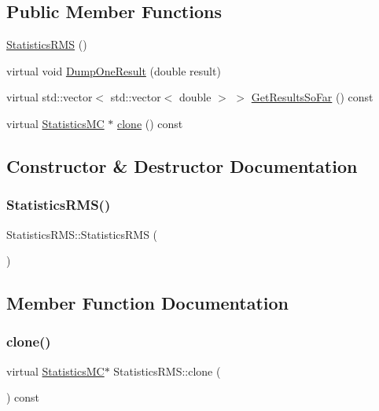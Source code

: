 \subsection*{Public Member Functions}
\begin{DoxyCompactItemize}
\item 
\hyperlink{classStatisticsRMS_affda90d3db0f1acde8094e1315abcd3f}{Statistics\+R\+MS} ()
\item 
virtual void \hyperlink{classStatisticsRMS_af9c972ac6ee7938f6690a99ee51b5771}{Dump\+One\+Result} (double result)
\item 
virtual std\+::vector$<$ std\+::vector$<$ double $>$ $>$ \hyperlink{classStatisticsRMS_a7c6b6ca7df8fac1cbfb16bca6272445b}{Get\+Results\+So\+Far} () const
\item 
virtual \hyperlink{classStatisticsMC}{Statistics\+MC} $\ast$ \hyperlink{classStatisticsRMS_af14e9befb5bfdb68b70e2e3e68206081}{clone} () const
\end{DoxyCompactItemize}


\subsection{Constructor \& Destructor Documentation}
\hypertarget{classStatisticsRMS_affda90d3db0f1acde8094e1315abcd3f}{}\label{classStatisticsRMS_affda90d3db0f1acde8094e1315abcd3f} 
\subsubsection{\texorpdfstring{Statistics\+R\+M\+S()}{StatisticsRMS()}}
{\footnotesize\ttfamily Statistics\+R\+M\+S\+::\+Statistics\+R\+MS (\begin{DoxyParamCaption}{ }\end{DoxyParamCaption})}



\subsection{Member Function Documentation}
\hypertarget{classStatisticsRMS_af14e9befb5bfdb68b70e2e3e68206081}{}\label{classStatisticsRMS_af14e9befb5bfdb68b70e2e3e68206081} 
\subsubsection{\texorpdfstring{clone()}{clone()}}
{\footnotesize\ttfamily virtual \hyperlink{classStatisticsMC}{Statistics\+MC}$\ast$ Statistics\+R\+M\+S\+::clone (\begin{DoxyParamCaption}{ }\end{DoxyParamCaption}) const\hspace{0.3cm}{\ttfamily [virtual]}}



